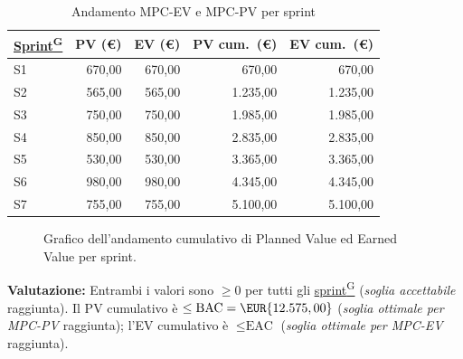 \documentclass[a4paper,12pt]{article}
\providecommand{\glslink}[2]{\href{https://alittlebyte-19.github.io/Documentazione/glossario.html\#gls-#1}{\underline{#2}\textsuperscript{\scriptsize G}}}
\begin{document}
\begin{table}[H]
\centering
{}
\begin{tabular}{|l|r|r|r|r|}
    \hline
    \rowcolor{gray!35}
    \textbf{\glslink{sprint}{Sprint}} & \textbf{PV (\euro)} & \textbf{EV (\euro)} & \textbf{PV cum.\ (\euro)} & \textbf{EV cum.\ (\euro)} \\
    \hline
    S1 & 670,00  & 670,00  & 670,00  & 670,00  \\
    S2 & 565,00  & 565,00  & 1.235,00 & 1.235,00 \\
    S3 & 750,00  & 750,00  & 1.985,00 & 1.985,00 \\
    S4 & 850,00  & 850,00  & 2.835,00 & 2.835,00 \\
    S5 & 530,00  & 530,00  & 3.365,00 & 3.365,00 \\
    S6 & 980,00  & 980,00  & 4.345,00 & 4.345,00 \\
    S7 & 755,00  & 755,00  & 5.100,00 & 5.100,00 \\
    \hline
\end{tabular}
\caption{Andamento MPC-EV e MPC-PV per sprint}
\end{table}

\begin{figure}[H]
\centering
{}
\caption{Grafico dell'andamento cumulativo di Planned Value ed Earned Value per sprint.}
\end{figure}

\noindent\textbf{Valutazione:} Entrambi i valori sono $\geq 0$ per tutti gli \glslink{sprint}{sprint} (\emph{soglia accettabile} raggiunta). Il PV cumulativo è $\leq \text{BAC} = \EUR{12.575,00}$ (\emph{soglia ottimale per MPC-PV} raggiunta); l'EV cumulativo è $\leq \text{EAC}$ (\emph{soglia ottimale per MPC-EV} raggiunta).
\end{document}
